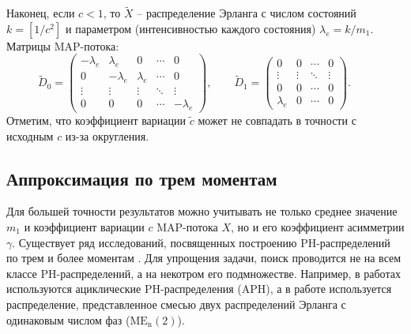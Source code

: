 Наконец, если $c < 1$, то $\tilde{X}$ -- распределение Эрланга с числом состояний $k = \left[ 1 / c^2 \right]$ и параметром (интенсивностью каждого состояния) $\lambda_e = k / m_1$. Матрицы MAP-потока:
$$
\tilde{D}_0 = \left(
    \begin{matrix}
        -\lambda_e & \lambda_e & 0 & \cdots & 0\\
        0 & -\lambda_e & \lambda_e & \cdots & 0\\
        \vdots & \vdots & \vdots & \ddots & \vdots\\
        0 & 0 & 0 & \cdots &-\lambda_e
    \end{matrix}
    \right),\qquad
\tilde{D}_1 = \left(
    \begin{matrix}
        0 & 0 & \cdots & 0\\
        \vdots & \vdots & \ddots & \vdots\\
        0 & 0 & \cdots & 0\\
        \lambda_e & 0 & \cdots & 0
    \end{matrix}
    \right).\qquad
$$
Отметим, что коэффициент вариации $\tilde{c}$ может не совпадать в точности с исходным $c$ из-за округления.





\subsection{Аппроксимация по трем моментам}\label{sec:ch4_approx_m3}

Для большей точности результатов можно учитывать не только среднее значение $m_1$ и коэффициент вариации $c$ MAP-потока $X$, но и его коэффициент асимметрии $\gamma$. Существует ряд исследований, посвященных построению PH-распределений по трем и более моментам \cite{Osogami2006,Bobbio2005,Johnson1989,Telek2003,Horvath2013a,VandenBosch2000,Horvath2007,Schmickler1992}. Для упрощения задачи, поиск проводится не на всем классе PH-распределений, а на некотром его подмножестве. Например, в работах \cite{Bobbio2005,Telek2003} используются ациклические PH-распределения (APH), а в работе \cite{Johnson1989} используется распределение, представленное смесью двух распределений Эрланга с одинаковым числом фаз ($\text{ME}_\text{n}(2)$).

